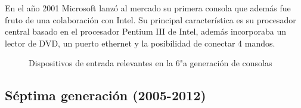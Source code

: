 En el a\~no 2001 Microsoft lanz\'o al mercado su primera consola que adem\'as fue fruto de una colaboraci\'on con Intel. Su principal caracter\'istica es su procesador central basado en el procesador Pentium III de Intel, adem\'as incorporaba un lector de DVD, un puerto ethernet y la posibilidad de conectar 4 mandos.

\begin{figure}[t]
     \hfill
{}
     \caption{Dispositivos de entrada relevantes en la 6"a  generaci\'on de consolas}
     \label{fig:sexta}
   \end{figure}


\subsection{S\'eptima generaci\'on (2005-2012)}


